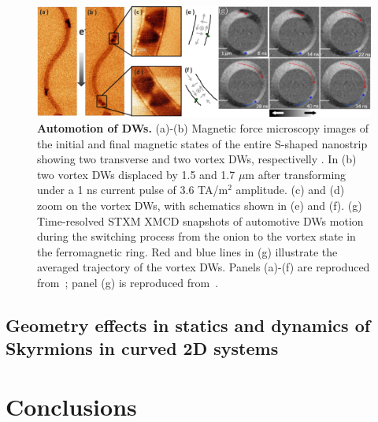 \documentclass[runningheads]{llncs}
\begin{document}
\begin{figure}[t]
	\includegraphics[width=\textwidth]{fig_automotion}
	\caption{\label{fig:automotion}%
		\textbf{Automotion of DWs.} (a)-(b) Magnetic force microscopy images of the initial and final magnetic states of the entire S-shaped nanostrip showing two transverse and two vortex DWs, respectivelly . In (b) two vortex DWs displaced by 1.5 and 1.7 $\mu$m after transforming under a 1 ns current pulse of 3.6 TA/m$^2$ amplitude. (c) and (d) zoom on the vortex DWs, with schematics shown in (e) and (f). (g) Time-resolved STXM XMCD snapshots of automotive DWs motion during the switching process from the onion to the vortex state in the ferromagnetic ring. Red and blue lines in (g) illustrate the averaged trajectory of the vortex DWs. Panels (a)-(f) are reproduced from~\cite{Chauleau10}; panel (g) is reproduced from~\cite{Mawass17}.}
\end{figure}

\subsection{Geometry effects in statics and dynamics of Skyrmions in curved 2D systems}\label{sec:effects_2D}

\section{Conclusions}



\end{document}
